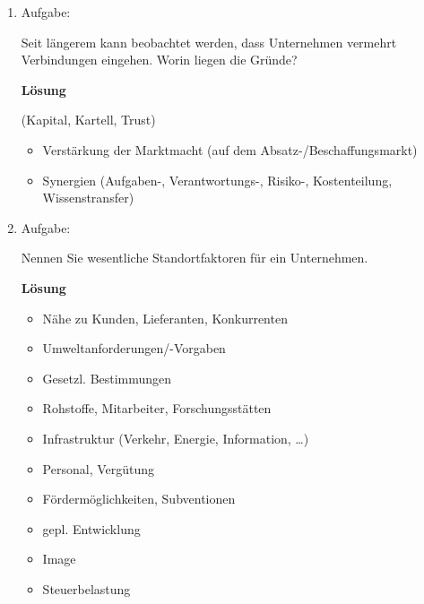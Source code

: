 \documentclass[12pt,a4paper]{scrreprt}
\newcommand{\Lsg}{\textbf{Lösung}\nobreak}
\begin{document}
\begin{enumerate}
\begin{enumerate}
\Lsg

\begin{comment}
\begin{tabular}{l|cccc|ccc}
\,	& \multicolumn{4}{|cccc|}{Sie} & \multicolumn{3}{|ccc|}{Er} & \\
\,	& -H & MA  & GB & -V	&	-MA & GB	& Vk	\\
Stille Gesellschaft & N & J &	J & J	& N		\\
K & Komm. & Komp. & J & Vertrag & Komm. & Ja & Nein	
GmbH & J & J & J & N & N & J & Vertrag	\\
AG & J & J & J & N & N & J & Vertrag	\\
GmbH \& Co. KG & 1Gesellsch.-GmbH & J & J & N & Kommand. & J & N	
\end{tabular}
\end{comment}

	\end{enumerate} 

 	\item{Aufgabe:}

Seit längerem kann beobachtet werden, dass Unternehmen vermehrt Verbindungen eingehen. Worin liegen die Gründe?

\Lsg

(Kapital, Kartell, Trust)

\begin{itemize}
\item Verstärkung der Marktmacht (auf dem Absatz-/Beschaffungsmarkt)
\item Synergien (Aufgaben-, Verantwortungs-, Risiko-, Kostenteilung, Wissenstransfer)
\end{itemize}

 	\item{Aufgabe:}

Nennen Sie wesentliche Standortfaktoren für ein Unternehmen.

\Lsg

\begin{itemize}
\item Nähe zu Kunden, Lieferanten, Konkurrenten
\item Umweltanforderungen/-Vorgaben
\item Gesetzl. Bestimmungen
\item Rohstoffe, Mitarbeiter, Forschungsstätten
\item Infrastruktur (Verkehr, Energie, Information, \ldots)
\item Personal, Vergütung
\item Fördermöglichkeiten, Subventionen
\item gepl. Entwicklung
\item Image
\item Steuerbelastung
\end{itemize}


\end{enumerate}
\end{document}
